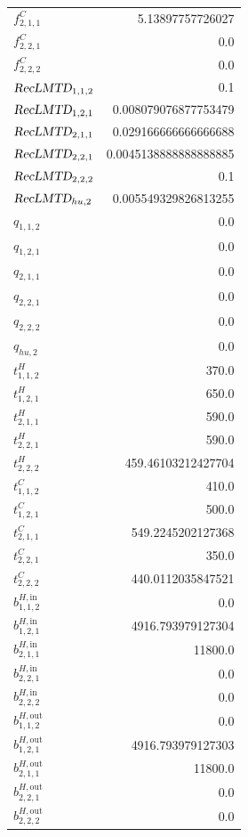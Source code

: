 \documentclass{article}%
\begin{document}
\begin{multicols*}{3}
\begin{supertabular}{lr}
	$f_{2,1,1}^{C}$ & 5.13897757726027 \\%
	$f_{2,2,1}^{C}$ & 0.0 \\%
	$f_{2,2,2}^{C}$ & 0.0 \\%
	$\textsl{RecLMTD}_{1,1,2}$ & 0.1 \\%
	$\textsl{RecLMTD}_{1,2,1}$ & 0.008079076877753479 \\%
	$\textsl{RecLMTD}_{2,1,1}$ & 0.029166666666666688 \\%
	$\textsl{RecLMTD}_{2,2,1}$ & 0.0045138888888888885 \\%
	$\textsl{RecLMTD}_{2,2,2}$ & 0.1 \\%
	$\textsl{RecLMTD}_{hu,2}$ & 0.005549329826813255 \\%
	$q_{1,1,2}$ & 0.0 \\%
	$q_{1,2,1}$ & 0.0 \\%
	$q_{2,1,1}$ & 0.0 \\%
	$q_{2,2,1}$ & 0.0 \\%
	$q_{2,2,2}$ & 0.0 \\%
	$q_{hu,2}$ & 0.0 \\%
	$t_{1,1,2}^{H}$ & 370.0 \\%
	$t_{1,2,1}^{H}$ & 650.0 \\%
	$t_{2,1,1}^{H}$ & 590.0 \\%
	$t_{2,2,1}^{H}$ & 590.0 \\%
	$t_{2,2,2}^{H}$ & 459.46103212427704 \\%
	$t_{1,1,2}^{C}$ & 410.0 \\%
	$t_{1,2,1}^{C}$ & 500.0 \\%
	$t_{2,1,1}^{C}$ & 549.2245202127368 \\%
	$t_{2,2,1}^{C}$ & 350.0 \\%
	$t_{2,2,2}^{C}$ & 440.0112035847521 \\%
	$b_{1,1,2}^{H,\text{in}}$ & 0.0 \\%
	$b_{1,2,1}^{H,\text{in}}$ & 4916.793979127304 \\%
	$b_{2,1,1}^{H,\text{in}}$ & 11800.0 \\%
	$b_{2,2,1}^{H,\text{in}}$ & 0.0 \\%
	$b_{2,2,2}^{H,\text{in}}$ & 0.0 \\%
	$b_{1,1,2}^{H,\text{out}}$ & 0.0 \\%
	$b_{1,2,1}^{H,\text{out}}$ & 4916.793979127303 \\%
	$b_{2,1,1}^{H,\text{out}}$ & 11800.0 \\%
	$b_{2,2,1}^{H,\text{out}}$ & 0.0 \\%
	$b_{2,2,2}^{H,\text{out}}$ & 0.0 \\%

\end{supertabular}
\end{multicols*}
\end{document}
